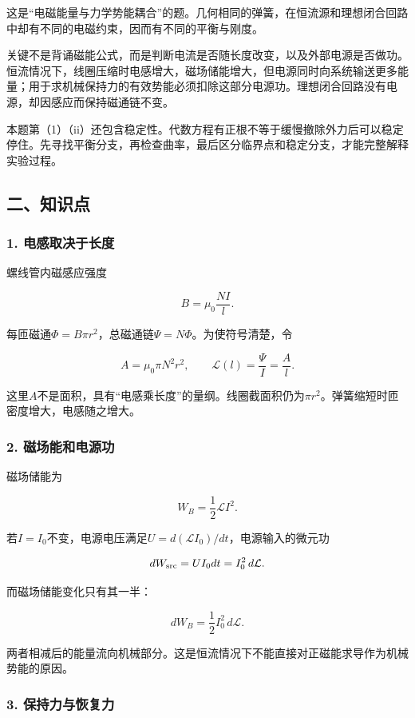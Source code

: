 \documentclass[12pt,a4paper,fontset=fandol]{ctexart}
\begin{document}
这是``电磁能量与力学势能耦合''的题。几何相同的弹簧，在恒流源和理想闭合回路中却有不同的电磁约束，因而有不同的平衡与刚度。

关键不是背诵磁能公式，而是判断电流是否随长度改变，以及外部电源是否做功。恒流情况下，线圈压缩时电感增大，磁场储能增大，但电源同时向系统输送更多能量；用于求机械保持力的有效势能必须扣除这部分电源功。理想闭合回路没有电源，却因感应而保持磁通链不变。

本题第（1）（ii）还包含稳定性。代数方程有正根不等于缓慢撤除外力后可以稳定停住。先寻找平衡分支，再检查曲率，最后区分临界点和稳定分支，才能完整解释实验过程。

\subsection{二、知识点}\label{ux4e8cux77e5ux8bc6ux70b9-1}

\subsubsection{1.
电感取决于长度}\label{ux7535ux611fux53d6ux51b3ux4e8eux957fux5ea6}

螺线管内磁感应强度

\[
B=\mu_0\frac{NI}{l}.
\]

每匝磁通\(\Phi=B\pi r^2\)，总磁通链\(\Psi=N\Phi\)。为使符号清楚，令

\[
A=\mu_0\pi N^2r^2,\qquad
\mathcal L(l)=\frac{\Psi}{I}=\frac Al.
\]

这里\(A\)不是面积，具有``电感乘长度''的量纲。线圈截面积仍为\(\pi r^2\)。弹簧缩短时匝密度增大，电感随之增大。

\subsubsection{2.
磁场能和电源功}\label{ux78c1ux573aux80fdux548cux7535ux6e90ux529f}

磁场储能为

\[
W_B=\frac12\mathcal LI^2.
\]

若\(I=I_0\)不变，电源电压满足\(U=d(\mathcal LI_0)/dt\)，电源输入的微元功

\[
dW_{\rm src}=UI_0dt=I_0^2\,d\mathcal L.
\]

而磁场储能变化只有其一半：

\[
dW_B=\frac12I_0^2\,d\mathcal L.
\]

两者相减后的能量流向机械部分。这是恒流情况下不能直接对正磁能求导作为机械势能的原因。

\subsubsection{3.
保持力与恢复力}\label{ux4fddux6301ux529bux4e0eux6062ux590dux529b}
\end{document}
